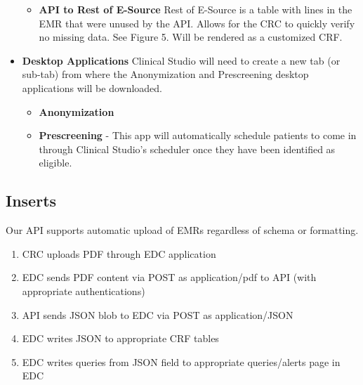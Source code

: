 \documentclass[12pt]{article}
\begin{document}
\begin{itemize}
\begin{itemize}
\item \textbf{API to Rest of E-Source} Rest of E-Source is a table with lines in the EMR that were unused by the API. Allows for the CRC to quickly verify no missing data. See Figure 5. Will be rendered as a customized CRF. 
 \end{itemize}

\item \textbf{Desktop Applications} Clinical Studio will need to create a new tab (or sub-tab) from where the Anonymization and Prescreening desktop applications will be downloaded.
\begin{itemize} 
\item \textbf{Anonymization}
\item \textbf{Prescreening} - This app will automatically schedule patients to come in through Clinical Studio's scheduler once they have been identified as eligible.
\end{itemize}

\end{itemize}




\subsection{Inserts}
Our API supports automatic upload of EMRs regardless of schema or formatting. 

\begin{enumerate}
\item CRC uploads PDF through EDC application
\item EDC sends PDF content via POST as application/pdf to API (with appropriate authentications)
\item API sends JSON blob to EDC via POST as application/JSON 
\item EDC writes JSON to appropriate CRF tables  
\item EDC writes queries from JSON field to appropriate queries/alerts page in EDC
\end{enumerate}
\end{document}
